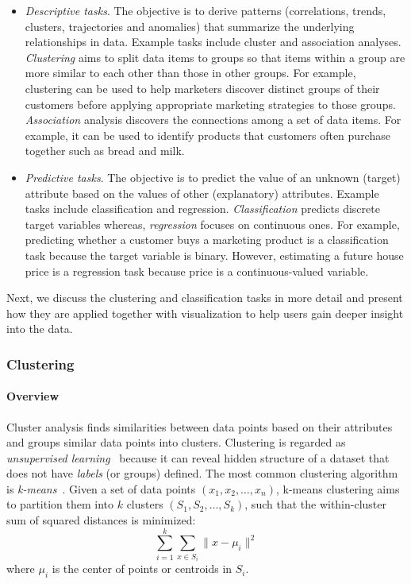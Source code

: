 \begin{itemize}
		\item \emph{Descriptive tasks}. The objective is to derive patterns (correlations, trends, clusters, trajectories and anomalies) that summarize the underlying relationships in data. Example tasks include cluster and association analyses. \emph{Clustering} aims to split data items to groups so that items within a group are more similar to each other than those in other groups. For example, clustering can be used to help marketers discover distinct groups of their customers before applying appropriate marketing strategies to those groups. \emph{Association} analysis discovers the connections among a set of data items. For example, it can be used to identify products that customers often purchase together such as bread and milk.
		
		\item \emph{Predictive tasks}. The objective is to predict the value of an unknown (target) attribute based on the values of other (explanatory) attributes. Example tasks include classification and regression. \emph{Classification} predicts discrete target variables whereas, \emph{regression} focuses on continuous ones. For example, predicting whether a customer buys a marketing product is a classification task because the target variable is binary. However, estimating a future house price is a regression task because price is a continuous-valued variable.
\end{itemize}

Next, we discuss the clustering and classification tasks in more detail and present how they are applied together with visualization to help users gain deeper insight into the data.

\subsubsection{Clustering}

\paragraph{Overview}
Cluster analysis finds similarities between data points based on their attributes and groups similar data points into clusters. Clustering is regarded as \emph{unsupervised learning}~\cite{Han2011} because it can reveal hidden structure of a dataset that does not have \emph{labels} (or groups) defined. The most common clustering algorithm is \emph{k-means}~\cite{Lloyd1982}. Given a set of data points $(x_1, x_2, \dots, x_n)$, k-means clustering aims to partition them into $k$ clusters $(S_1, S_2, \dots, S_k)$, such that the within-cluster sum of squared distances is minimized: 
\[
\sum_{i=1}^k\sum_{x\in S_i} \lVert x-\mu_i \rVert^2
\]
where $\mu_i$ is the center of points or centroids in $S_i$. 

